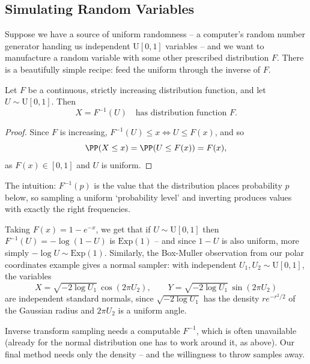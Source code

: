 \subsection{Simulating Random Variables}

Suppose we have a source of uniform randomness -- a computer's random number generator handing us independent $\mathrm{U}[0, 1]$ variables -- and we want to manufacture a random variable with some other prescribed distribution $F$. There is a beautifully simple recipe: feed the uniform through the inverse of $F$.

\begin{theorem}
	Let $F$ be a continuous, strictly increasing distribution function, and let $U \sim \mathrm{U}[0, 1]$. Then
	$$
	X = F^{-1}(U) \quad \text{has distribution function } F.
	$$
\end{theorem}
\begin{proof}
	Since $F$ is increasing, $F^{-1}(U) \leq x \iff U \leq F(x)$, and so
	$$
	\PP(X \leq x) = \PP(U \leq F(x)) = F(x),
	$$
	as $F(x) \in [0, 1]$ and $U$ is uniform.
\end{proof}

The intuition: $F^{-1}(p)$ is the value that the distribution places probability $p$ below, so sampling a uniform `probability level' and inverting produces values with exactly the right frequencies.

\begin{example}
	Taking $F(x) = 1 - e^{-x}$, we get that if $U \sim \mathrm{U}[0,1]$ then $F^{-1}(U) = -\log(1 - U)$ is $\mathrm{Exp}(1)$ -- and since $1 - U$ is also uniform, more simply $-\log U \sim \mathrm{Exp}(1)$. Similarly, the Box-Muller observation from our polar coordinates example gives a normal sampler: with independent $U_1, U_2 \sim \mathrm{U}[0,1]$, the variables
	$$
	X = \sqrt{-2\log U_1}\,\cos(2\pi U_2), \qquad Y = \sqrt{-2\log U_1}\,\sin(2\pi U_2)
	$$
	are independent standard normals, since $\sqrt{-2\log U_1}$ has the density $re^{-r^2/2}$ of the Gaussian radius and $2\pi U_2$ is a uniform angle.
\end{example}

Inverse transform sampling needs a computable $F^{-1}$, which is often unavailable (already for the normal distribution one has to work around it, as above). Our final method needs only the density -- and the willingness to throw samples away.

